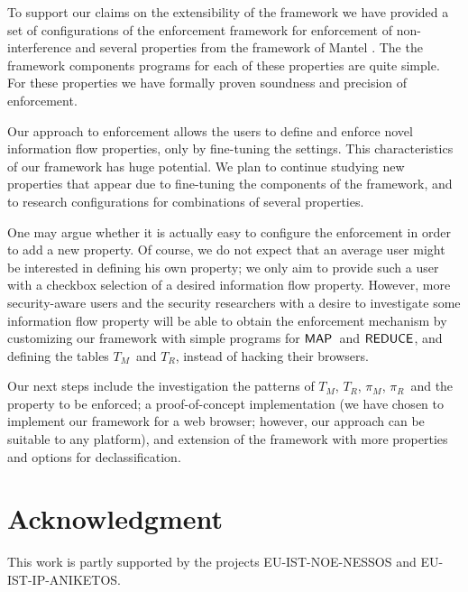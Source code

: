 \documentclass[10pt,a4paper,oneside]{article}
\def\ProgM{\ensuremath{\Prog_{M}}}
\def\ProgR{\ensuremath{\Prog_{R}}}
\def\TAV{\ensuremath{T_{M}}}
\def\TPV{\ensuremath{T_{R}}}
\def\sanserif#1{\ensuremath{\sf #1}}
\def\REDUCE{\ensuremath{\sanserif{REDUCE}}}
\def\MAP{\ensuremath{\sanserif{MAP}}}
\def\Prog{\ensuremath{\pi}}
\begin{document}
To support our claims on the extensibility of the framework we have provided a set of configurations of the enforcement framework for enforcement of non-interference and several properties from the framework of Mantel \cite{MANT-00-CSF}. The the framework components programs for each of these properties are quite simple. For these properties we have formally proven soundness and precision of enforcement.

Our approach to enforcement allows the users to define and enforce novel information flow properties, only by fine-tuning the settings. This characteristics of our framework has huge potential. We plan to continue studying new properties that appear due to fine-tuning the components of the framework, and to research configurations for combinations of several properties.

One may argue whether it is actually easy to configure the enforcement in order to add a new property. Of course, we do not expect that an average user might be interested in defining his own property; we only aim to provide such a user with a checkbox selection of a desired information flow property. However, more security-aware users and the security researchers with a desire to investigate some information flow property will be able to obtain the enforcement mechanism by customizing our framework with simple programs for \MAP\ and \REDUCE, and defining the tables \TAV\ and \TPV, instead of hacking their browsers.

Our next steps include the investigation the patterns of \TAV, \TPV, \ProgM, \ProgR\ and the property to be enforced; a proof-of-concept implementation (we have chosen to implement our framework for a web browser; however, our approach can be suitable to any platform), and extension of the framework with more properties and options for declassification.

\section*{Acknowledgment}
This work is partly supported by the projects EU-IST-NOE-NESSOS and EU-IST-IP-ANIKETOS.
\end{document}
